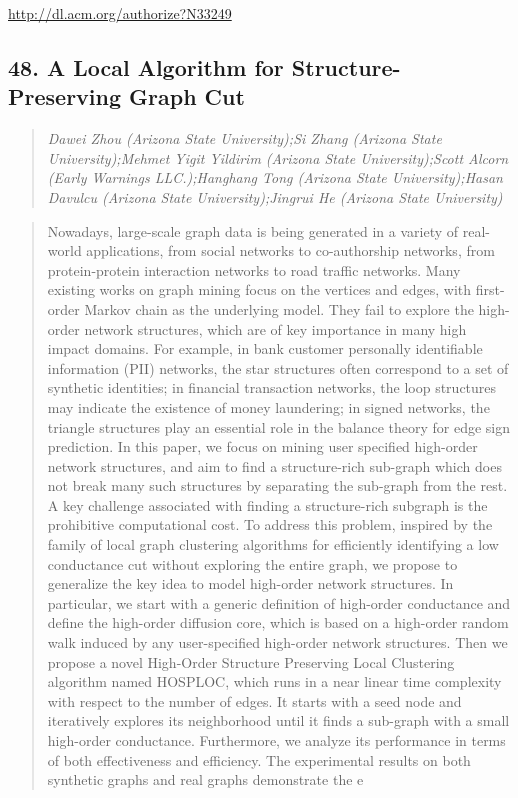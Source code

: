 \documentclass{article}
\begin{document}
\href{http://dl.acm.org/authorize?N33249}{http://dl.acm.org/authorize?N33249}

\subsection{48. A Local Algorithm for Structure-Preserving Graph Cut}

\begin{quote}
\footnotesize{\textit{Dawei Zhou (Arizona State University);Si Zhang (Arizona State University);Mehmet Yigit Yildirim (Arizona State University);Scott Alcorn (Early Warnings LLC.);Hanghang Tong (Arizona State University);Hasan Davulcu (Arizona State University);Jingrui He (Arizona State University)}}

\end{quote}

\begin{quote}
Nowadays, large-scale graph data is being generated in a variety of real-world applications, from social networks to co-authorship networks, from protein-protein interaction networks to road traffic networks. Many existing works on graph mining focus on the vertices and edges, with first-order Markov chain as the underlying model. They fail to explore the high-order network structures, which are of key importance in many high impact domains. For example, in bank customer personally identifiable information (PII) networks, the star structures often correspond to a set of synthetic identities; in financial transaction networks, the loop structures may indicate the existence of money laundering; in signed networks, the triangle structures play an essential role in the balance theory for edge sign prediction. In this paper, we focus on mining user specified high-order network structures, and aim to find a structure-rich sub-graph which does not break many such structures by separating the sub-graph from the rest. A key challenge associated with finding a structure-rich subgraph is the prohibitive computational cost. To address this problem, inspired by the family of local graph clustering algorithms for efficiently identifying a low conductance cut without exploring the entire graph, we propose to generalize the key idea to model high-order network structures. In particular, we start with a generic definition of high-order conductance and define the high-order diffusion core, which is based on a high-order random walk induced by any user-specified high-order network structures. Then we propose a novel High-Order Structure Preserving Local Clustering algorithm named HOSPLOC, which runs in a near linear time complexity with respect to the number of edges. It starts with a seed node and iteratively explores its neighborhood until it finds a sub-graph with a small high-order conductance. Furthermore, we analyze its performance in terms of both effectiveness and efficiency. The experimental results on both synthetic graphs and real graphs demonstrate the e
\end{quote}
\end{document}
